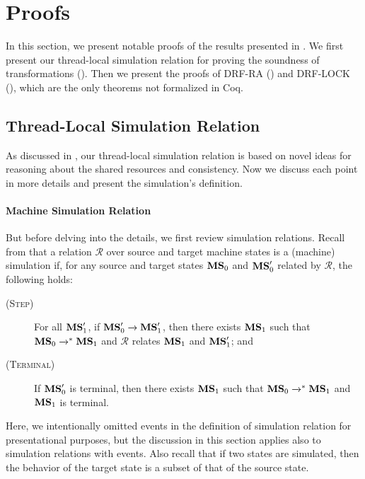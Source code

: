 \section{Proofs}
\label{sec:relaxed:proofs}

In this section, we present notable proofs of the results presented in .  We first
present our thread-local simulation relation for proving the soundness of transformations
().  Then we present the proofs of DRF-RA
() and DRF-LOCK (), which are the
only theorems not formalized in Coq.


\subsection{Thread-Local Simulation Relation}
\label{sec:relaxed:proofs:simulation}

As discussed in , our thread-local simulation relation is based on novel
ideas for reasoning about the shared resources and consistency.  Now we discuss each point in more
details and present the simulation's definition.


\paragraph{Machine Simulation Relation}

But before delving into the details, we first review simulation relations.  Recall from
 that a relation $\mathcal{R}$ over source and target machine
states is a (machine) simulation if, for any source and target states ${\mathbf{MS}}_0$ and ${\mathbf{MS}}'_0$
related by $\mathcal{R}$, the following holds:
\begin{description}
\item[\textsc{(Step)}] For all ${\mathbf{MS}}'_1$, if ${\mathbf{MS}}'_0 \xrightarrow{} {\mathbf{MS}}'_1$, then there exists
  ${\mathbf{MS}}_1$ such that ${\mathbf{MS}}_0 \xrightarrow{}^* {\mathbf{MS}}_1$ and $\mathcal{R}$ relates ${\mathbf{MS}}_1$ and
  ${\mathbf{MS}}'_1$; and
\item[\textsc{(Terminal)}] If ${\mathbf{MS}}'_0$ is terminal, then there exists ${\mathbf{MS}}_1$ such that
  ${\mathbf{MS}}_0 \xrightarrow{}^* {\mathbf{MS}}_1$ and ${\mathbf{MS}}_1$ is terminal.
\end{description}
%
Here, we intentionally omitted events in the definition of simulation relation for presentational
purposes, but the discussion in this section applies also to simulation relations with events.  Also
recall that if two states are simulated, then the behavior of the target state is a subset of that
of the source state.


